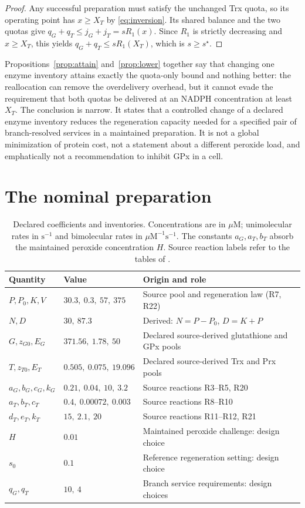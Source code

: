 \documentclass[11pt,a4paper]{article}
\theoremstyle{plain}
\theoremstyle{definition}
\theoremstyle{remark}
\newcommand{\uM}{\ensuremath{\mu\mathrm{M}}}
\begin{document}
\begin{proof}
Any successful preparation must satisfy the unchanged Trx quota, so its operating
point has $x\ge X_T$ by \eqref{eq:inversion}. Its shared balance and the two
quotas give $q_G+q_T\le j_G+j_T=sR_1(x)$. Since $R_1$ is strictly decreasing and
$x\ge X_T$, this yields $q_G+q_T\le sR_1(X_T)$, which is $s\ge s^\star$.
\end{proof}

Propositions~\ref{prop:attain} and~\ref{prop:lower} together say that changing one
enzyme inventory attains exactly the quota-only bound and nothing better: the
reallocation can remove the overdelivery overhead, but it cannot evade the
requirement that both quotas be delivered at an NADPH concentration at least
$X_T$. The conclusion is narrow. It states that a controlled change of a declared
enzyme inventory reduces the regeneration capacity needed for a specified pair of
branch-resolved services in a maintained preparation. It is not a global
minimization of protein cost, not a statement about a different peroxide load, and
emphatically not a recommendation to inhibit GPx in a cell.

\section{The nominal preparation}\label{sec:nominal}

\begin{table}[tb]
\centering\small
\caption{Declared coefficients and inventories. Concentrations are in \uM;
unimolecular rates in $\mathrm{s}^{-1}$ and bimolecular rates in
$\uM^{-1}\mathrm{s}^{-1}$. The constants $a_G,a_T,b_T$ absorb the maintained
peroxide concentration $H$. Source reaction labels refer to the tables of
\citet{adimora2010}.}
\label{tab:params}
\begin{tabular}{lll}
\toprule
Quantity & Value & Origin and role\\
\midrule
$P,P_0,K,V$ & $30.3,\ 0.3,\ 57,\ 375$ & Source pool and regeneration law (R7, R22)\\
$N,D$ & $30,\ 87.3$ & Derived: $N=P-P_0$, $D=K+P$\\
$G,z_{G0},E_G$ & $371.56,\ 1.78,\ 50$ & Declared source-derived glutathione and GPx pools\\
$T,z_{T0},E_T$ & $0.505,\ 0.075,\ 19.096$ & Declared source-derived Trx and Prx pools\\
$a_G,b_G,c_G,k_G$ & $0.21,\ 0.04,\ 10,\ 3.2$ & Source reactions R3--R5, R20\\
$a_T,b_T,c_T$ & $0.4,\ 0.00072,\ 0.003$ & Source reactions R8--R10\\
$d_T,e_T,k_T$ & $15,\ 2.1,\ 20$ & Source reactions R11--R12, R21\\
\midrule
$H$ & $0.01$ & Maintained peroxide challenge: design choice\\
$s_0$ & $0.1$ & Reference regeneration setting: design choice\\
$q_G,q_T$ & $10,\ 4$ & Branch service requirements: design choices\\
\bottomrule
\end{tabular}
\end{table}
\end{document}
